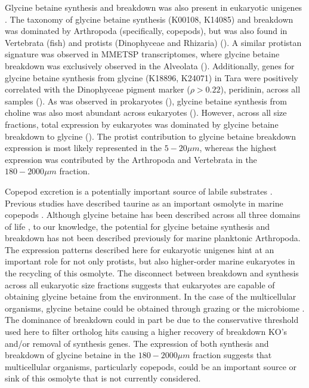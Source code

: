 \documentclass[utf8]{frontiersSCNS} %
\begin{document}
Glycine betaine synthesis and breakdown was also present in eukaryotic unigenes \citep{Carradec2018}. The taxonomy of glycine betaine synthesis (K00108, K14085) and breakdown was dominated by Arthropoda (specifically, copepods), but was also found in Vertebrata (fish) and protists (Dinophyceae and Rhizaria) (). A similar protistan signature was observed in MMETSP transcriptomes, where  glycine betaine breakdown was exclusively observed in the Alveolata (). Additionally, genes for glycine betaine synthesis from glycine (K18896, K24071) in Tara were positively correlated with the Dinophyceae pigment marker ($\rho > 0.22$), peridinin, across all samples (). As was observed in prokaryotes (), glycine betaine synthesis from choline was also most abundant across eukaryotes (). However, across all size fractions, total expression by eukaryotes was dominated by glycine betaine breakdown to glycine (). The protist contribution to glycine betaine breakdown expression is most likely represented in the $5-20\mu m$, whereas the highest expression was contributed by the Arthropoda and Vertebrata in the $180-2000\mu m$ fraction.

Copepod excretion is a potentially important source of labile substrates \citep{Maas2020}. Previous studies have described taurine as an important osmolyte in marine copepods \citep{Clifford2020}. Although glycine betaine has been described across all three domains of life \citep{Yancey2005}, to our knowledge, the potential for glycine betaine synthesis and breakdown has not been described previously for marine planktonic Arthropoda. The expression patterns described here for eukaryotic unigenes hint at an important role for not only protists, but also higher-order marine eukaryotes in the recycling of this osmolyte. The disconnect between breakdown and synthesis across all eukaryotic size fractions suggests that eukaryotes are capable of obtaining glycine betaine from the environment. In the case of the multicellular organisms, glycine betaine could be obtained through grazing or the microbiome \citep{Shoemaker2017}. The dominance of breakdown could in part be due to the conservative threshold used here to filter ortholog hits causing a higher recovery of breakdown KO's and/or removal of synthesis genes. The expression of both synthesis and breakdown of glycine betaine in the $180-2000 \mu m$ fraction suggests that multicellular organisms, particularly copepods, could be an important source or sink of this osmolyte that is not currently considered.
\end{document}
